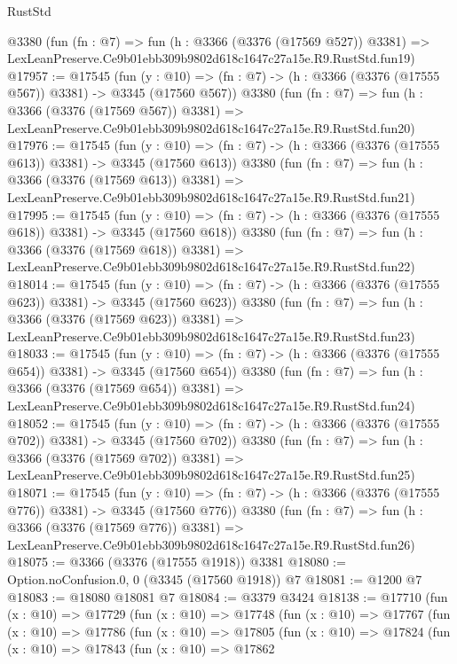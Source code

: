 \begin{lexlean}{RustStd}
\begin{coremodule}
    @3380
    (fun (fn : @7) =>
    fun (h : @3366 (@3376 (@17569 @527)) @3381) =>
    LexLeanPreserve.Ce9b01ebb309b9802d618c1647c27a15e.R9.RustStd.fun19)
@17957 := @17545
    (fun (y : @10) => (fn : @7) -> (h : @3366 (@3376 (@17555 @567)) @3381) -> @3345 (@17560 @567))
    @3380
    (fun (fn : @7) =>
    fun (h : @3366 (@3376 (@17569 @567)) @3381) =>
    LexLeanPreserve.Ce9b01ebb309b9802d618c1647c27a15e.R9.RustStd.fun20)
@17976 := @17545
    (fun (y : @10) => (fn : @7) -> (h : @3366 (@3376 (@17555 @613)) @3381) -> @3345 (@17560 @613))
    @3380
    (fun (fn : @7) =>
    fun (h : @3366 (@3376 (@17569 @613)) @3381) =>
    LexLeanPreserve.Ce9b01ebb309b9802d618c1647c27a15e.R9.RustStd.fun21)
@17995 := @17545
    (fun (y : @10) => (fn : @7) -> (h : @3366 (@3376 (@17555 @618)) @3381) -> @3345 (@17560 @618))
    @3380
    (fun (fn : @7) =>
    fun (h : @3366 (@3376 (@17569 @618)) @3381) =>
    LexLeanPreserve.Ce9b01ebb309b9802d618c1647c27a15e.R9.RustStd.fun22)
@18014 := @17545
    (fun (y : @10) => (fn : @7) -> (h : @3366 (@3376 (@17555 @623)) @3381) -> @3345 (@17560 @623))
    @3380
    (fun (fn : @7) =>
    fun (h : @3366 (@3376 (@17569 @623)) @3381) =>
    LexLeanPreserve.Ce9b01ebb309b9802d618c1647c27a15e.R9.RustStd.fun23)
@18033 := @17545
    (fun (y : @10) => (fn : @7) -> (h : @3366 (@3376 (@17555 @654)) @3381) -> @3345 (@17560 @654))
    @3380
    (fun (fn : @7) =>
    fun (h : @3366 (@3376 (@17569 @654)) @3381) =>
    LexLeanPreserve.Ce9b01ebb309b9802d618c1647c27a15e.R9.RustStd.fun24)
@18052 := @17545
    (fun (y : @10) => (fn : @7) -> (h : @3366 (@3376 (@17555 @702)) @3381) -> @3345 (@17560 @702))
    @3380
    (fun (fn : @7) =>
    fun (h : @3366 (@3376 (@17569 @702)) @3381) =>
    LexLeanPreserve.Ce9b01ebb309b9802d618c1647c27a15e.R9.RustStd.fun25)
@18071 := @17545
    (fun (y : @10) => (fn : @7) -> (h : @3366 (@3376 (@17555 @776)) @3381) -> @3345 (@17560 @776))
    @3380
    (fun (fn : @7) =>
    fun (h : @3366 (@3376 (@17569 @776)) @3381) =>
    LexLeanPreserve.Ce9b01ebb309b9802d618c1647c27a15e.R9.RustStd.fun26)
@18075 := @3366 (@3376 (@17555 @1918)) @3381
@18080 := Option.noConfusion.{0, 0} (@3345 (@17560 @1918)) @7
@18081 := @1200 @7
@18083 := @18080 @18081 @7
@18084 := @3379 @3424
@18138 := @17710
    (fun (x : @10) =>
    @17729
      (fun (x : @10) =>
      @17748
        (fun (x : @10) =>
        @17767
          (fun (x : @10) =>
          @17786
            (fun (x : @10) =>
            @17805
              (fun (x : @10) =>
              @17824
                (fun (x : @10) =>
                @17843
                  (fun (x : @10) =>
                  @17862

\end{coremodule}
\end{lexlean}
